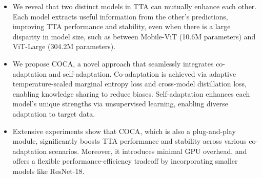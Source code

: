 \begin{itemize}

     \item We reveal that two distinct models in TTA can mutually enhance each other. Each model extracts useful information from the other's predictions, improving TTA performance and stability, even when there is a large disparity in model size, such as between Mobile-ViT (10.6M parameters) and ViT-Large (304.2M parameters). 
     
     
     
     \item We propose COCA, a novel approach that seamlessly integrates co-adaptation and self-adaptation. Co-adaptation is achieved via adaptive temperature-scaled marginal entropy loss and cross-model distillation loss, enabling knowledge sharing to reduce biases. Self-adaptation enhances each model's unique strengths via unsupervised learning, enabling diverse adaptation to target data. 
     
     \item Extensive experiments show that COCA, which is also a plug-and-play module, significantly boosts TTA performance and stability across various co-adaptation scenarios. Moreover, it introduces minimal GPU overhead, and offers a flexible performance-efficiency tradeoff by incorporating smaller models like ResNet-18.
     
     


\end{itemize}







